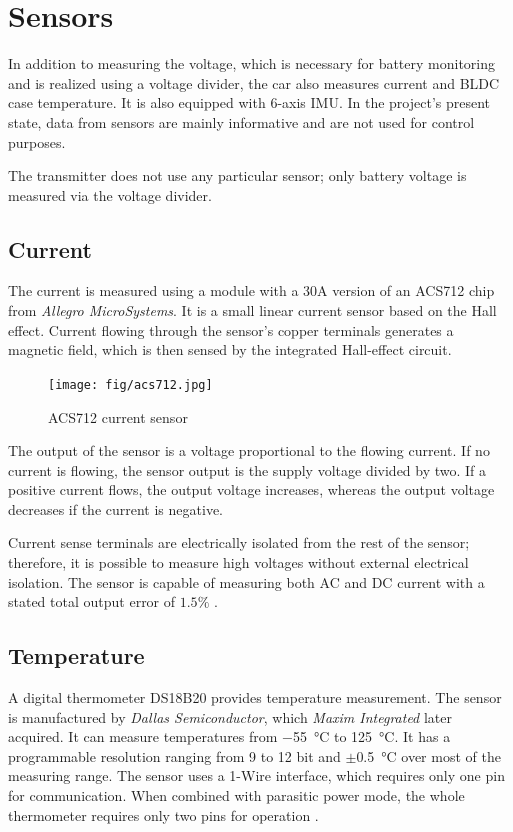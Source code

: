 \section{Sensors}
\label{hw_sensors}
In addition to measuring the voltage, which is necessary for battery monitoring and is realized using a voltage divider, the car also measures current and BLDC case temperature. It is also equipped with 6-axis IMU. In the project's present state, data from sensors are mainly informative and are not used for control purposes.

The transmitter does not use any particular sensor; only battery voltage is measured via the voltage divider.

\subsection{Current}	
The current is measured using a module with a 30A version of an ACS712 chip from \textit{Allegro MicroSystems}. It is a small linear current sensor based on the Hall effect. Current flowing through the sensor's copper terminals generates a magnetic field, which is then sensed by the integrated Hall-effect circuit.
\begin{figure}[h]
\centering
\texttt{[image: fig/acs712.jpg]}
\caption{ACS712 current sensor \cite{acs_pic}}
\label{fig:ds18b20}
\end{figure}

The output of the sensor is a voltage proportional to the flowing current. If no current is flowing, the sensor output is the supply voltage divided by two. If a positive current flows, the output voltage increases, whereas the output voltage decreases if the current is negative.

Current sense terminals are electrically isolated from the rest of the sensor; therefore, it is possible to measure high voltages without external electrical isolation. The sensor is capable of measuring both AC and DC current with a stated total output error of $1.5\%$ \cite{acs_datasheet}.

\subsection{Temperature}
A digital thermometer DS18B20 provides temperature measurement. The sensor is manufactured by \textit{Dallas Semiconductor}, which \textit{Maxim Integrated} later acquired. It can measure temperatures from \SI{-55}{\degreeCelsius} to \SI{125}{\degreeCelsius}. It has a programmable resolution ranging from 9 to 12 bit and $\pm$\SI{0.5}{\degreeCelsius} over most of the measuring range. The sensor uses a 1-Wire interface, which requires only one pin for communication. When combined with parasitic power mode, the whole thermometer requires only two pins for operation \cite{ds_datasheet}.

